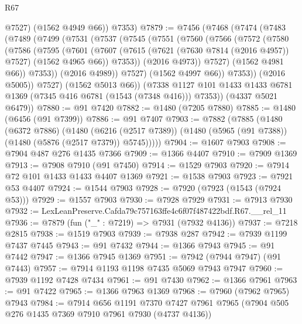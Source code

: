 \begin{lexlean}{R67}
\begin{coremodule}
          @7527)
        (@1562 @4949 @66))
      @7353)
@7879 := @7456
    (@7468
      (@7474
        (@7483
          (@7489
            (@7499
              (@7531
                (@7537
                  (@7545
                    (@7551
                      (@7560
                        (@7566
                          (@7572
                            (@7580
                              (@7586
                                (@7595
                                  (@7601
                                    (@7607
                                      (@7615
                                        (@7621 (@7630 @7814 (@2016 @4957)) @7527)
                                        (@1562 @4965 @66))
                                      @7353))
                                  (@2016 @4973))
                                @7527)
                              (@1562 @4981 @66))
                            @7353))
                        (@2016 @4989))
                      @7527)
                    (@1562 @4997 @66))
                  @7353))
              (@2016 @5005))
            @7527)
          (@1562 @5013 @66))
        (@7338 @1127 @101 @1433 @1433 @6781 @1369 (@7345 @416 @6781 (@1543 (@7348 @416))) @7353))
      (@4337 @5021 @6479))
@7880 := @91 @7420
@7882 := @1480 (@7205 @7880)
@7885 := @1480 (@6456 (@91 @7399))
@7886 := @91 @7407
@7903 := @7882
    (@7885
      (@1480
        (@6372 @7886)
        (@1480
          (@6216 (@2517 @7389))
          (@1480 (@5965 (@91 @7388)) (@1480 (@5876 (@2517 @7379)) @5745)))))
@7904 := @1607 @7903
@7908 := @7904 @487 @276 @1435 @7366
@7909 := @1366 @4407
@7910 := @7909 @1369
@7913 := @7908 @7910 (@91 @7450)
@7914 := @1529 @7903
@7920 := @7914 @72 @101 @1433 @1433 @4407 @1369
@7921 := @1538 @7903
@7923 := @7921 @53 @4407
@7924 := @1544 @7903
@7928 := @7920 (@7923 (@1543 (@7924 @53)))
@7929 := @1557 @7903
@7930 := @7928 @7929
@7931 := @7913 @7930
@7932 := LexLeanPreserve.Cafda79c757163ffe4c6f07f487422bdf.R67.__rel_11
@7936 := @7879 (fun ("_" : @7219) => @7931 (@7932 @4136))
@7937 := @7218 @2815
@7938 := @1519 @7903
@7939 := @7938 @287
@7942 := @7939 @1199 @7437 @7445
@7943 := @91 @7432
@7944 := @1366 @7943
@7945 := @91 @7442
@7947 := @1366 @7945 @1369
@7951 := @7942 (@7944 @7947) (@91 @7443)
@7957 := @7914 @1193 @1198 @7435 @5069 @7943 @7947
@7960 := @7939 @1192 @7428 @7434
@7961 := @91 @7430
@7962 := @1366 @7961
@7963 := @91 @7422
@7965 := @1366 @7963 @1369
@7968 := @7960 (@7962 @7965) @7943
@7984 := @7914
    @656
    @1191
    @7370
    @7427
    @7961
    @7965
    (@7904 @505 @276 @1435 @7369 @7910 @7961 @7930 (@4737 @4136))

\end{coremodule}
\end{lexlean}
